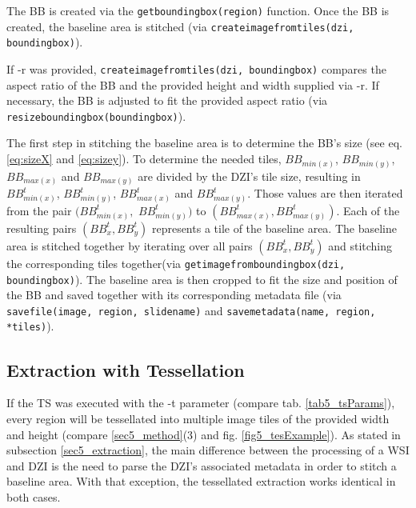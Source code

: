 The BB is created via the \texttt{get{\textunderscore}bounding{\textunderscore}box(region)} function. Once the BB is created, the baseline area is stitched (via \texttt{create{\textunderscore}image{\textunderscore}from{\textunderscore}tiles({\allowbreak}dzi, bounding{\textunderscore}box)}). 

If -r was provided, \texttt{create{\textunderscore}image{\textunderscore}from{\textunderscore}tiles({\allowbreak}dzi, bounding{\textunderscore}box)} compares the aspect ratio of the BB and the provided height and width supplied via -r.  If necessary, the BB is adjusted to fit the provided aspect ratio (via \texttt{resize{\textunderscore}bounding{\textunderscore}box(bounding{\textunderscore}box)}).
 
The first step in stitching the baseline area is to determine the BB's size (see eq. \ref{eq:sizeX} and \ref{eq:sizey}). To determine the needed tiles, $BB_{min(x)}$, $BB_{min(y)}$, $BB_{max(x)}$ and $BB_{max(y)}$ are divided by the DZI's tile size, resulting in $BB_{min(x)}^t$, $BB_{min(y)}^t$, $BB_{max(x)}^t$ and $BB_{max(y)}^t$. Those values are then iterated from the pair $(BB_{min(x)}^t,$ $BB_{min(y)}^t)$ to $(BB_{max(x)}^t, BB_{max(y)}^t)$. Each of the resulting pairs $(BB_x^t, BB_y^t)$ represents a tile of the baseline area. The baseline area is stitched together by iterating over all pairs $(BB_x^t, BB_y^t)$ and stitching the corresponding tiles together(via \texttt{get{\textunderscore}image{\textunderscore}from{\textunderscore}bounding{\textunderscore}box(dzi, bounding{\textunderscore}box)}). The baseline area is then cropped to fit the size and position of the BB and saved together with its corresponding metadata file (via \texttt{save{\textunderscore}file(image, region, slide{\textunderscore}name)} and \texttt{save{\textunderscore}metadata(name, region, *tiles)}).


\subsection{Extraction with Tessellation}
\label{sec5_tessellation}
If the TS was executed with the -t parameter (compare tab. \ref{tab5_tsParams}), every region will be tessellated into multiple image tiles of the provided width and height (compare \ref{sec5_method}(3) and fig. \ref{fig5_tesExample}). As stated in subsection \ref{sec5_extraction}, the main difference between the processing of a WSI and DZI is the need to parse the DZI's associated metadata in order to stitch a baseline area. With that exception, the tessellated extraction works identical in both cases.

